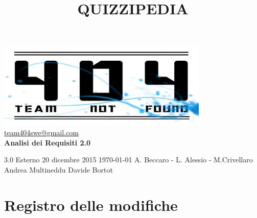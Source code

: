 \documentclass[a4paper,11pt]{article}
\title{\textbf{{\fontsize{8mm}{5mm}\selectfont QUIZZIPEDIA}}}
\date{}
\author{}
\begin{document}
	\maketitle
	\thispagestyle{empty}
	\begin{center}
	\includegraphics{team_not_found.jpg}\\
	\fontsize{5mm}{3mm}\url{team404swe@gmail.com}\\
	
	\vspace{50mm}
	\textbf{Analisi dei Requisiti 2.0}
	\end{center}
	
			{3.0} 							%
			{Esterno} 						%
			{20 dicembre 2015} 				%
			{\today} 						%
			{A. Beccaro - L. Alessio - M.Crivellaro}	%
			{Andrea Multineddu} 				%
			{Davide Bortot} 		%
	\newpage
	\thispagestyle{empty}
	\null
	\newpage
		
	\hspace{30 mm}
	\fancyfoot[R]{\thepage}
	\section*{Registro delle modifiche}
	
\end{document}
